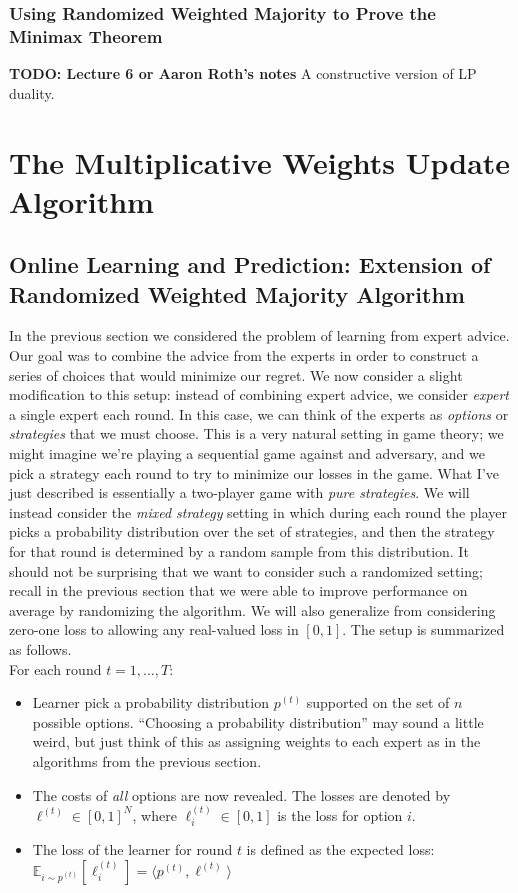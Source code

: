 \documentclass[12pt]{article}
\newcommand{\E}{\mathbb{E}}
\begin{document}
\subsubsection{Using Randomized Weighted Majority to Prove the Minimax Theorem}
\textbf{TODO: Lecture 6 or Aaron Roth's notes}
A constructive version of LP duality. 


\section{The Multiplicative Weights Update Algorithm}

\subsection{Online Learning and Prediction: Extension of Randomized Weighted Majority Algorithm}
In the previous section we considered the problem of learning from expert advice. Our goal was to combine the advice from the experts in order to construct a series of choices that would
minimize our regret. We now consider a slight modification to this setup: instead of combining expert advice, we consider \textit{expert} a single expert each round. In this case, we can think 
of the experts as \textit{options} or \textit{strategies} that we must choose. This is a very natural setting in game theory; we might imagine we're playing a sequential game against and adversary, 
and we pick a strategy each round to try to minimize our losses in the game. What I've just described is essentially a two-player game with \textit{pure strategies}. We will instead consider the 
\textit{mixed strategy} setting in which during each round the player picks a probability distribution over the set of strategies, and then the strategy for that round is determined by a random sample from this 
distribution. It should not be surprising that we want to consider such a randomized setting; recall in the previous section that we were able to improve performance on average by randomizing the algorithm. 
We will also generalize from considering zero-one loss to allowing any real-valued loss in $[0, 1]$. The setup is summarized as follows. \\
For each round $t = 1, \dots, T$:
\begin{itemize}
\item Learner pick a probability distribution $p^{(t)}$ supported on the set of $n$ possible options. ``Choosing a probability distribution'' may sound a little weird, but just think of this as 
assigning weights to each expert as in the algorithms from the previous section. 
\item The costs of \textit{all} options are now revealed. The losses are denoted by $\ell^{(t)} \in [0, 1]^N$, where $\ell^{(t)}_i \in [0, 1]$ is the loss for option $i$. 
\item The loss of the learner for round $t$ is defined as the expected loss: $\E_{i \sim p^{(t)}}[\ell^{(t)}_i] = \langle p^{(t)}, \ell^{(t)}\rangle$
\end{itemize} 
\end{document}
